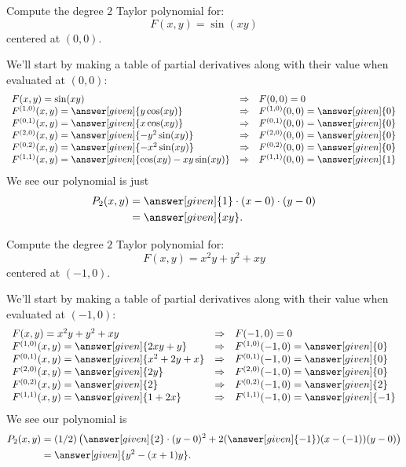 \documentclass{ximera}
\begin{document}
\begin{example}
  Compute the degree $2$ Taylor polynomial for:
  \[
  F(x,y)=\sin(xy)
  \]
  centered at $(0,0)$.
  \begin{explanation}
    We'll start by making a table of partial derivatives along with
    their value when evaluated at $(0,0)$:
    \[
    \begin{array}{lcl}
      F(x,y) = \sin(xy) & \Rightarrow &F(0,0) = 0\\
      F^{(1,0)}(x,y) = \answer[given]{y\cos(xy)} & \Rightarrow & F^{(1,0)}(0,0) = \answer[given]{0}\\
      F^{(0,1)}(x,y) = \answer[given]{x\cos(xy)} &\Rightarrow  & F^{(0,1)}(0,0) = \answer[given]{0}\\
      F^{(2,0)}(x,y) = \answer[given]{-y^2\sin(xy)} &\Rightarrow & F^{(2,0)}(0,0) = \answer[given]{0}\\
      F^{(0,2)}(x,y) = \answer[given]{-x^2\sin(xy)} &\Rightarrow & F^{(0,2)}(0,0) = \answer[given]{0}\\
      F^{(1,1)}(x,y) = \answer[given]{\cos(xy)-xy\sin(xy)} &\Rightarrow & F^{(1,1)}(0,0) = \answer[given]{1}
    \end{array}
    \]
    We see our polynomial is just
    \begin{align*}
      P_2(x,y) &= \answer[given]{1}\cdot (x-0)\cdot (y-0)\\
      &= \answer[given]{xy}.
    \end{align*}
  \end{explanation}
\end{example}


\begin{example}
  Compute the degree $2$ Taylor polynomial for:
  \[
  F(x,y)= x^2 y + y^2 + x y
  \]
  centered at $(-1,0)$.
  \begin{explanation}
    We'll start by making a table of partial derivatives along with
    their value when evaluated at $(-1,0)$:
    \[
    \begin{array}{lcl}
      F(x,y) = x^2y+y^2+xy & \Rightarrow &F(-1,0) = 0\\
      F^{(1,0)}(x,y) = \answer[given]{2xy+y} & \Rightarrow & F^{(1,0)}(-1,0) = \answer[given]{0}\\
      F^{(0,1)}(x,y) = \answer[given]{x^2+2y+x} &\Rightarrow  & F^{(0,1)}(-1,0) = \answer[given]{0}\\
      F^{(2,0)}(x,y) = \answer[given]{2y} &\Rightarrow & F^{(2,0)}(-1,0) = \answer[given]{0}\\
      F^{(0,2)}(x,y) = \answer[given]{2} &\Rightarrow & F^{(0,2)}(-1,0) = \answer[given]{2}\\
      F^{(1,1)}(x,y) = \answer[given]{1+2x} &\Rightarrow & F^{(1,1)}(-1,0) = \answer[given]{-1}
    \end{array}
    \]
    We see our polynomial is
    \begin{align*}
      P_2(x,y) &= (1/2)\left(\answer[given]{2}\cdot (y-0)^2 + 2 (\answer[given]{-1})(x-(-1))(y-0) \right)\\
      &= \answer[given]{y^2-(x+1)y}.
    \end{align*}
  \end{explanation}
\end{example}
\end{document}
